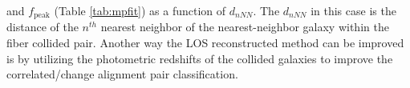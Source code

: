                                                                                                                                                                                                                                                                          and $f_\mathrm{peak}$ (Table \ref{tab:mpfit}) as a function of $d_{nNN}$. 
                                                                                                                                                                                                                                                                         The $d_{nNN}$ in this case is the distance of the $n^{th}$ nearest 
                                                                                                                                                                                                                                                                         neighbor of the nearest-neighbor galaxy within the fiber collided pair.  
                                                                                                                                                                                                                                                                         Another way the LOS reconstructed method can be improved is by utilizing 
                                                                                                                                                                                                                                                                         the photometric redshifts of the collided galaxies to improve the 
                                                                                                                                                                                                                                                                         correlated/change alignment pair classification. 

